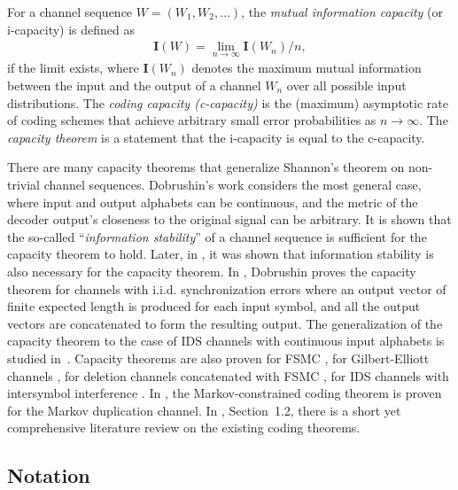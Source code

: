 \documentclass[journal, twocol]{IEEEtran}
\newcommand{\bfI}{{\mathbf{I}}}
\begin{document}
For a channel sequence $W=(W_1,W_2,\dots)$, the \emph{mutual information capacity} (or i-capacity) is defined as 
\begin{align}
\bfI(W)=\lim_{n\to\infty}\bfI(W_n)/n,
\end{align} 
if the limit exists, where $\bfI(W_n)$ denotes the maximum mutual information between the input and the output of a channel $W_n$ over all possible input distributions. 
The \emph{coding capacity (c-capacity)} is the (maximum) asymptotic rate of coding schemes that achieve arbitrary small error probabilities as $n\to\infty$. The \emph{capacity theorem} is a statement that the i-capacity is equal to the c-capacity.

There are many capacity theorems that generalize Shannon's theorem on non-trivial channel sequences.
Dobrushin's work \cite{dobrushin59ageneral} considers the most general case, where input and output alphabets can be continuous, and the metric of the decoder output's closeness to the original signal can be arbitrary.
It is shown that the so-called ``\emph{information stability}'' of a channel sequence is sufficient for the capacity theorem to hold.
Later, in \cite{hu62shannon}, it was shown that information stability is also necessary for the capacity theorem.
In \cite{dobrushin67shannons}, Dobrushin proves the capacity theorem for channels with i.i.d. synchronization errors where an output vector of finite expected length is produced for each input symbol, and all the output vectors are concatenated to form the resulting output. 
The generalization of the capacity theorem to the case of IDS channels with continuous input alphabets is studied in~\cite{stambler70memoryless}.
Capacity theorems are also proven for FSMC \cite{gallager68information}, for Gilbert-Elliott channels \cite{mushkin89capacity}, for deletion channels concatenated with FSMC \cite{li21capacity}, for IDS channels with intersymbol interference \cite{mao18models}.
In \cite{mcbain24noisy}, the Markov-constrained coding theorem is proven for the Markov duplication channel.
In \cite{con2025channels}, Section~1.2, there is a short yet comprehensive literature review on the existing coding theorems.


\subsection{Notation}
\end{document}
